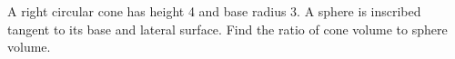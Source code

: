 A right circular cone has height 4 and base radius 3. A sphere is inscribed tangent to its base and lateral surface. Find the ratio of cone volume to sphere volume.
